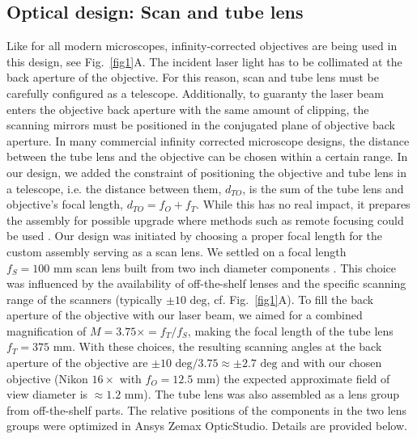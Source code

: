 \documentclass[10pt,letterpaper]{article}
\begin{document}
\subsection*{Optical design: Scan and tube lens}
Like for all modern microscopes, infinity-corrected objectives are being used in this design, see Fig.~\ref{fig1}A. The incident laser light has to be collimated at the back aperture of the objective. For this reason, scan and tube lens must be carefully configured as a telescope. Additionally, to guaranty the laser beam enters the objective back aperture with the same amount of clipping, the scanning mirrors must be positioned in the conjugated plane of objective back aperture. In many commercial infinity corrected microscope designs, the distance between the tube lens and the objective can be chosen within a certain range. In our design, we added the constraint of positioning the objective and tube lens in a telescope, i.e. the distance between them, $d_{TO}$, is the sum of the tube lens and objective's focal length, $d_{TO} = f_O + f_T$. While this has no real impact, it prepares the assembly for possible upgrade where methods such as remote focusing could be used \cite{Botcherby2007, Botcherby2012, Sofroniew2016}. 
Our design was initiated by choosing a proper focal length for the custom assembly serving as a scan lens. We settled on a focal length $f_S=100\text{ mm}$  scan lens built from two inch diameter components \cite{Yao2023}. This choice was influenced by the availability of off-the-shelf lenses and the specific scanning range of the scanners (typically $\pm10\text{ deg}$, cf. Fig.~\ref{fig1}A). To fill the back aperture of the objective with our laser beam, we aimed for a combined magnification of $M=3.75\times=f_T/f_S$, making the focal length of the tube lens $f_T=375\text{ mm}$. With these choices, the resulting scanning angles at the back aperture of the objective are $\pm10\text{ deg}/3.75\approx\pm2.7\text{ deg}$ and with our chosen objective (Nikon $16\times$ with $f_O=12.5\text{ mm}$) the expected approximate field of view diameter is $\approx 1.2\text{ mm}$).\newline
The tube lens was also assembled as a lens group from off-the-shelf parts. The relative positions of the components in the two lens groups were optimized in Ansys Zemax OpticStudio. Details are provided below.
%
\end{document}
